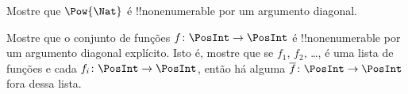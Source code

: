 \documentclass[../../../include/open-logic-section]{subfiles}
\begin{document}
\begin{prob}
Mostre que $\Pow{\Nat}$ é !!{nonenumerable} por um argumento diagonal.
\end{prob}

\begin{prob}\label{sfr:siz:nen:prob:f-posint}
Mostre que o conjunto de funções $f \colon \PosInt \to \PosInt$ é
!!{nonenumerable} por um argumento diagonal explícito. Isto é, mostre que
se $f_1$, $f_2$, \dots, é uma lista de funções e cada $f_i\colon
\PosInt \to \PosInt$, então há alguma $\overline{f}\colon \PosInt \to
\PosInt$ fora dessa lista.
\end{prob}
\end{document}
